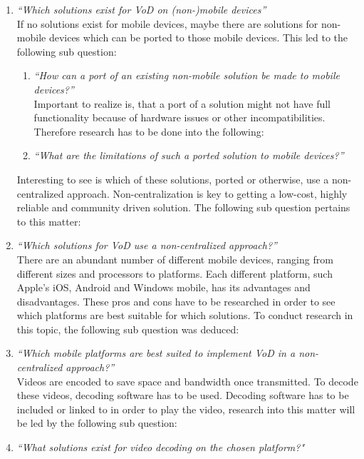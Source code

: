 \begin{enumerate}
	\item\textit{``Which solutions exist for VoD on (non-)mobile devices''}\\
	
	If no solutions exist for mobile devices, maybe there are solutions for non-mobile devices which can be ported to those mobile devices. This led to the following sub question:\\

		\begin{enumerate}
			\item\textit{``How can a port of an existing non-mobile solution be made to mobile devices?''}\\
			
			Important to realize is, that a port of a solution might not have full functionality because of hardware issues or other incompatibilities. Therefore research has to be done into the following:\\
			
			\item\textit{``What are the limitations of such a ported solution to mobile devices?''}\\
		\end{enumerate}

	Interesting to see is which of these solutions, ported or otherwise, use a non-centralized approach. Non-centralization is key to getting a low-cost, highly reliable and community driven solution. The following sub question pertains to this matter: \\

	\item\textit{``Which solutions for VoD use a non-centralized approach?''}\\

	There are an abundant number of different mobile devices, ranging from different sizes and processors to platforms. Each different platform, such Apple's iOS, Android and Windows mobile, has its advantages and disadvantages. These pros and cons have to be researched in order to see which platforms are best suitable for which solutions. To conduct research in this topic, the following sub question was deduced:\\

	\item\textit{``Which mobile platforms are best suited to implement VoD in a non-centralized approach?''}\\
	
	Videos are encoded to save space and bandwidth once transmitted. To decode these videos, decoding software has to be used. Decoding software has to be included or linked to in order to play the video, research into this matter will be led by the following sub question:\\

	\item\textit{``What solutions exist for video decoding on the chosen platform?"}\\
\end{enumerate}

